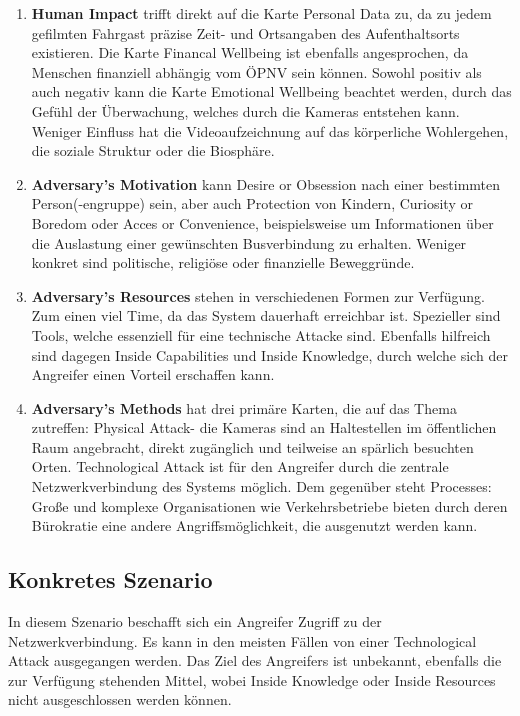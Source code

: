 \begin{enumerate}
      \item {\bfseries Human Impact} trifft direkt auf die Karte \glqq{}Personal Data\grqq{} zu, da zu jedem gefilmten Fahrgast präzise Zeit- und Ortsangaben des Aufenthaltsorts existieren.
            Die Karte \glqq{}Financal Wellbeing\grqq{} ist ebenfalls angesprochen, da Menschen finanziell abhängig vom ÖPNV sein können. Sowohl positiv als auch negativ kann die Karte \glqq{}Emotional Wellbeing\grqq{}
            beachtet werden, durch das Gefühl der Überwachung, welches durch die Kameras entstehen kann. Weniger Einfluss hat die Videoaufzeichnung auf das körperliche Wohlergehen, die soziale Struktur oder die Biosphäre.
      \item {\bfseries Adversary's Motivation} kann \glqq{}Desire or Obsession\grqq{} nach einer bestimmten Person(-engruppe) sein, aber auch \glqq{}Protection\grqq{} von Kindern, \glqq{}Curiosity or Boredom\grqq{} oder \glqq{}Acces or Convenience\grqq{},
            beispielsweise um Informationen über die Auslastung einer gewünschten Busverbindung zu erhalten. Weniger konkret sind politische, religiöse oder finanzielle Beweggründe.
      \item {\bfseries Adversary's Resources} stehen in verschiedenen Formen zur Verfügung. Zum einen viel \glqq{}Time\grqq{}, da das System dauerhaft erreichbar ist. Spezieller sind \glqq{}Tools\grqq{}, welche essenziell für eine technische Attacke sind.
            Ebenfalls hilfreich sind dagegen \glqq{}Inside Capabilities\grqq{} und \glqq{}Inside Knowledge\grqq{}, durch welche sich der Angreifer einen Vorteil erschaffen kann.
      \item {\bfseries Adversary's Methods} hat drei primäre Karten, die auf das Thema zutreffen: \glqq{}Physical Attack\grqq{}- die Kameras sind an Haltestellen im öffentlichen Raum angebracht, direkt zugänglich und teilweise an spärlich besuchten Orten.
            \glqq{}Technological Attack\grqq{} ist für den Angreifer durch die zentrale Netzwerkverbindung des Systems möglich. Dem gegenüber steht \glqq{}Processes\grqq{}: Große und komplexe Organisationen wie Verkehrsbetriebe
            bieten durch deren Bürokratie eine andere Angriffsmöglichkeit, die ausgenutzt werden kann.
\end{enumerate}
\subsection{Konkretes Szenario}
In diesem Szenario beschafft sich ein Angreifer Zugriff zu der Netzwerkverbindung. Es kann in den meisten Fällen von einer \glqq{}Technological Attack\grqq{} ausgegangen werden. Das Ziel des Angreifers ist unbekannt, ebenfalls die zur Verfügung stehenden Mittel,
wobei \glqq{}Inside Knowledge\grqq{} oder \glqq{}Inside Resources\grqq{} nicht ausgeschlossen werden können.

